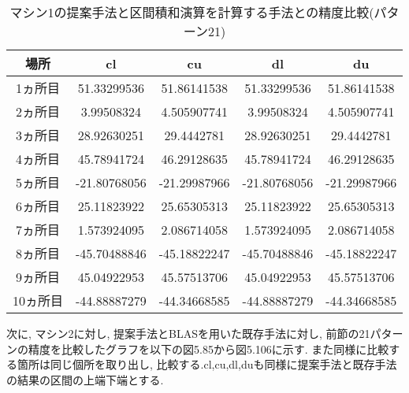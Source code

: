 \documentclass[11pt,a4paper]{jsreport}
\theoremstyle{definition}
\begin{document}
\begin{table}[H]
\centering
\begin{tabular}{|c|c|c|c|c|}
\hline
場所 & cl & cu & dl & du \\ \hline
1ヵ所目 & 51.33299536 & 51.86141538 & 51.33299536 & 51.86141538 \\ \hline
2ヵ所目 & 3.99508324 & 4.505907741 & 3.99508324 & 4.505907741 \\ \hline
3ヵ所目 & 28.92630251 & 29.4442781 & 28.92630251 & 29.4442781 \\ \hline
4ヵ所目 & 45.78941724 & 46.29128635 & 45.78941724 & 46.29128635 \\ \hline
5ヵ所目 & -21.80768056 & -21.29987966 & -21.80768056 & -21.29987966 \\ \hline
6ヵ所目 & 25.11823922 & 25.65305313 & 25.11823922 & 25.65305313 \\ \hline
7ヵ所目 & 1.573924095 & 2.086714058 & 1.573924095 & 2.086714058 \\ \hline
8ヵ所目 & -45.70488846 & -45.18822247 & -45.70488846 & -45.18822247 \\ \hline
9ヵ所目 & 45.04922953 & 45.57513706 & 45.04922953 & 45.57513706 \\ \hline
10ヵ所目 & -44.88887279 & -44.34668585 & -44.88887279 & -44.34668585 \\ \hline
\end{tabular}
\caption{マシン1の提案手法と区間積和演算を計算する手法との精度比較(パターン21)}
\end{table}



\indent 次に, マシン2に対し, 提案手法とBLASを用いた既存手法に対し, 前節の21パターンの精度を比較したグラフを以下の図5.85から図5.106に示す. また同様に比較する箇所は同じ個所を取り出し, 比較する.cl,cu,dl,duも同様に提案手法と既存手法の結果の区間の上端下端とする.
\end{document}
